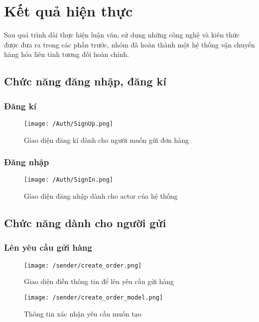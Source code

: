 \chapter{Kết quả hiện thực}\label{chap:result}
		Sau quá trình dài thực hiện luận văn, sử dụng những công nghệ và kiên thức được đưa
		ra trong các phần trước, nhóm đã hoàn thành một hệ thống vận chuyển hàng hóa liên tỉnh tương đối hoàn chỉnh.
		
		\section{Chức năng đăng nhập, đăng kí}
			\subsection{Đăng kí}
				\begin{figure}[H]
					\texttt{[image: /Auth/SignUp.png]}
					\centering
					\caption{Giao diện đăng kí dành cho người muốn gửi đơn hàng}
				\end{figure}
			
			\subsection{Đăng nhập}
				\begin{figure}[H]
					\texttt{[image: /Auth/SignIn.png]}
					\centering
					\caption{Giao diện đăng nhập dành cho actor của hệ thống}
				\end{figure}
			
			
		\section{Chức năng dành cho người gửi}
			\subsection{Lên yêu cầu gửi hàng}
				\begin{figure}[H]
					\texttt{[image: /sender/create\_order.png]}
					\centering
					\caption{Giao diện điền thông tin để lên yêu cầu gửi hàng}
				\end{figure}
				
				\begin{figure}[H]
					\texttt{[image: /sender/create\_order\_model.png]}
					\centering
					\caption{Thông tin xác nhận yêu cầu muốn tạo}
				\end{figure}
				
